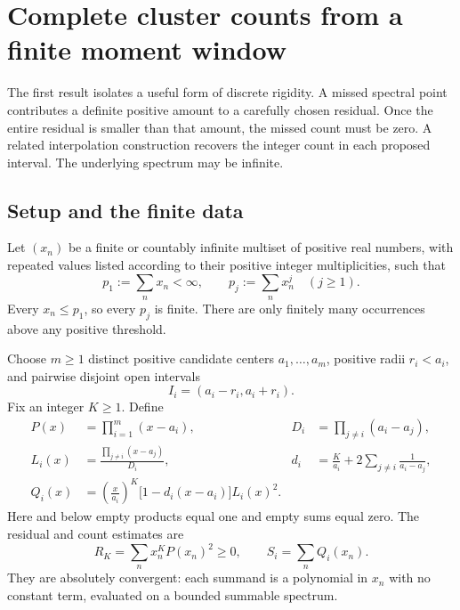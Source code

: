 \section{Complete cluster counts from a finite moment window}
\label{sec:spectral}

The first result isolates a useful form of discrete rigidity. A missed spectral
point contributes a definite positive amount to a carefully chosen residual.
Once the entire residual is smaller than that amount, the missed count must
be zero. A related interpolation construction recovers the integer count in
each proposed interval. The underlying spectrum may be infinite.

\subsection{Setup and the finite data}

Let $(x_n)$ be a finite or countably infinite multiset of positive real numbers,
with repeated values listed according to their positive integer multiplicities,
such that
\begin{equation}\label{eq:summability}
 p_1:=\sum_n x_n<\infty,
 \qquad p_j:=\sum_n x_n^j\quad(j\ge1).
\end{equation}
Every $x_n\le p_1$, so every $p_j$ is finite. There are only finitely many
occurrences above any positive threshold.

Choose $m\ge1$ distinct positive candidate centers $a_1,\ldots,a_m$, positive
radii $r_i<a_i$, and pairwise disjoint open intervals
\[
 I_i=(a_i-r_i,a_i+r_i).
\]
Fix an integer $K\ge1$. Define
\begin{align}
 P(x)&=\prod_{i=1}^m(x-a_i),
 &D_i&=\prod_{j\ne i}(a_i-a_j),\label{eq:P}\\
 L_i(x)&=\frac{\prod_{j\ne i}(x-a_j)}{D_i},
 &d_i&=\frac K{a_i}+2\sum_{j\ne i}\frac1{a_i-a_j},\label{eq:L}\\
 Q_i(x)&=\left(\frac x{a_i}\right)^K
       \bigl[1-d_i(x-a_i)\bigr]L_i(x)^2.\label{eq:Q}
\end{align}
Here and below empty products equal one and empty sums equal zero.
The residual and count estimates are
\begin{equation}\label{eq:RS}
 R_K=\sum_n x_n^K P(x_n)^2\ge0,
 \qquad S_i=\sum_n Q_i(x_n).
\end{equation}
They are absolutely convergent: each summand is a polynomial in $x_n$ with
no constant term, evaluated on a bounded summable spectrum.

